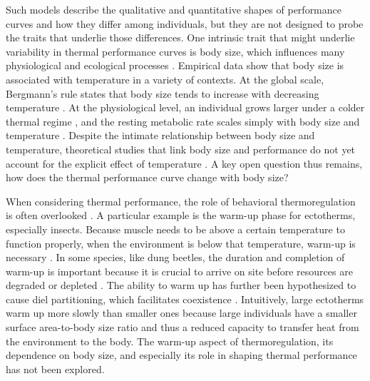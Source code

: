 Such models describe the qualitative and quantitative shapes of performance curves and how they differ among individuals, but they are not designed to probe the traits that underlie those differences.
One intrinsic trait that might underlie variability in thermal performance curves is body size, which influences many physiological and ecological processes \citep{Calder1984,Schmidt1984,Peters1986}.
Empirical data show that body size is associated with temperature in a variety of contexts.
At the global scale, Bergmann's rule states that body size tends to increase with decreasing temperature \citep{Bergmann1847, Blackburn1999}.
At the physiological level, an individual grows larger under a colder thermal regime \citep{VanVoorhies1996}, and the resting metabolic rate scales simply with body size and temperature \citep{Kleiber1947, Peters1986, Gillooly2001, Brown2004}.
Despite the intimate relationship between body size and temperature, theoretical studies that link body size and performance do not yet account for the explicit effect of temperature \citep[e.g.,][]{Yodzis1992, Brown1993}.
A key open question thus remains, how does the thermal performance curve change with body size?

When considering thermal performance, the role of behavioral thermoregulation is often overlooked \citep{Kearney2009b}.
A particular example is the warm-up phase for ectotherms, especially insects.
Because muscle needs to be above a certain temperature to function properly, when the environment is below that temperature, warm-up is necessary \citep[e.g.,][]{Heinrich1975}.
In some species, like dung beetles, the duration and completion of warm-up is important because it is crucial to arrive on site before resources are degraded or depleted \citep{Hanski1991}. %
The ability to warm up has further been hypothesized to cause diel partitioning, which facilitates coexistence \citep{Viljanen2009}.
Intuitively, large ectotherms warm up more slowly than smaller ones because large individuals have a smaller surface area-to-body size ratio and thus a reduced capacity to transfer heat from the environment to the body.
The warm-up aspect of thermoregulation, its dependence on body size, and especially its role in shaping thermal performance has not been explored.

